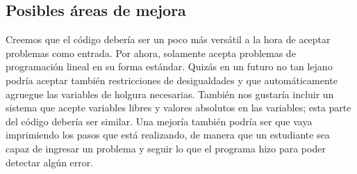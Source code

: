 \documentclass[12pt]{article}
\begin{document}
\subsection{Posibles áreas de mejora}
Creemos que el código debería ser un poco más versátil a la hora de aceptar problemas como entrada. Por ahora, solamente acepta problemas de programación lineal en su forma estándar. Quizás en un futuro no tan lejano podría aceptar también restricciones de desigualdades y que automáticamente agruegue las variables de holgura necesarias. También nos gustaría incluir un sistema que acepte variables libres y valores absolutos en las variables; esta parte del código debería ser similar. Una mejoría también podría ser que vaya imprimiendo los pasos que está realizando, de manera que un estudiante sea capaz de ingresar un problema y seguir lo que el programa hizo para poder detectar algún error.
\end{document}

